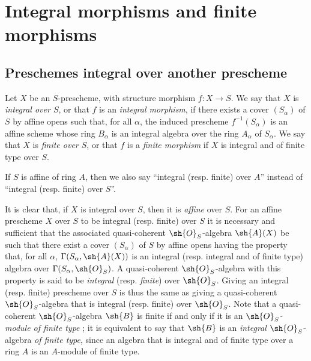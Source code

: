 \section{Integral morphisms and finite morphisms}
\label{section:II.6}


\subsection{Preschemes integral over another prescheme}
\label{subsection:II.6.1}

\begin{definition}[6.1.1]
\label{II.6.1.1}
Let $X$ be an $S$-prescheme, with structure morphism $f:X\to S$.
We say that $X$ is \emph{integral over $S$}, or that $f$ is an \emph{integral morphism}, if there exists a cover $(S_\alpha)$ of $S$ by affine opens such that, for all $\alpha$, the induced prescheme $f^{-1}(S_\alpha)$ is an affine scheme whose ring $B_\alpha$ is an integral algebra over the ring $A_\alpha$ of $S_\alpha$.
We say that $X$ is \emph{finite over $S$}, or that $f$ is a \emph{finite morphism} if $X$ is integral and of finite type over $S$.
\end{definition}

If $S$ is affine of ring $A$, then we also say ``integral (resp. finite) over $A$'' instead of ``integral (resp. finite) over $S$''.

\begin{env}[6.1.2]
\label{II.6.1.2}
It is clear that, if $X$ is integral over $S$, then it is \emph{affine} over $S$.
For an affine prescheme $X$ over $S$ to be integral (resp. finite) over $S$ it is necessary and sufficient that the associated quasi-coherent $\sh{O}_S$-algebra $\sh{A}(X)$ be such that there exist a cover $(S_\alpha)$ of $S$ by affine opens having the property that, for all $\alpha$, $\Gamma(S_\alpha,\sh{A}(X))$ is an integral (resp. integral and of finite type) algebra over $\Gamma(S_\alpha,\sh{O}_S)$.
A quasi-coherent $\sh{O}_S$-algebra with this property is said to be \emph{integral} (resp. \emph{finite}) over $\sh{O}_S$.
Giving an integral (resp. finite) prescheme over $S$ is thus  the same as giving a quasi-coherent $\sh{O}_S$-algebra that is integral (resp. finite) over $\sh{O}_S$.
Note that a quasi-coherent $\sh{O}_S$-algebra $\sh{B}$ is finite if and only if it is an \emph{$\sh{O}_S$-module of finite type} ;
it is equivalent to say that $\sh{B}$ is an \emph{integral} $\sh{O}_S$-algebra \emph{of finite type}, since an algebra that is integral and of finite type over a ring $A$ is an $A$-module of finite type.
\end{env}

